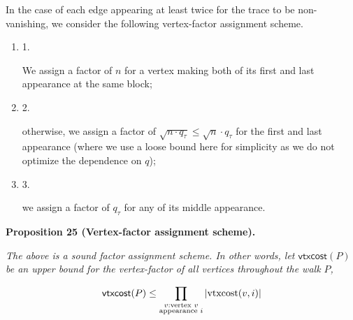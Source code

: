 \documentclass[10pt,a4paper]{article}
\begin{document}
In the case of each edge appearing at least twice for the trace to be non-vanishing, we consider the following vertex-factor assignment scheme.\par




\begin{enumerate}


\item[] 
1. 


We assign a factor of $n$ for a vertex making both of its first and last appearance at the same block;\par





\item[] 
2. 


otherwise, we assign a factor of $\sqrt{n\cdot q_{\tau}}\leq\sqrt{n}\cdot q_{\tau}$ for the first and last appearance (where we use a loose bound here for simplicity as we do not optimize the dependence on $q$);\par





\item[] 
3. 


we assign a factor of $q_{\tau}$ for any of its middle appearance.\par





\end{enumerate}





\par\medskip\noindent\textbf{
\textbf{Proposition 25}\textbf{ }(Vertex-factor assignment scheme)\textbf{.}
}\par



\emph{The above is a sound factor assignment scheme. In other words,
let $\mathsf{vtxcost}(P)$ be an upper bound for the vertex-factor of all vertices throughout the walk $P$,}\par


\[\begin{gathered}
\mathsf{vtxcost}(P)\leq\prod_{\begin{subarray}{c}v:\text{vertex }v\\
\text{appearance }i\end{subarray}}|\text{vtxcost}(v,i)|
\end{gathered}\]
\end{document}
